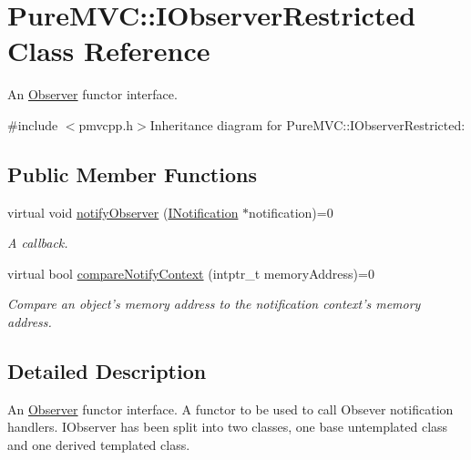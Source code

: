 \hypertarget{class_pure_m_v_c_1_1_i_observer_restricted}{
\section{PureMVC::IObserverRestricted Class Reference}
\label{class_pure_m_v_c_1_1_i_observer_restricted}
}


An \hyperlink{class_pure_m_v_c_1_1_observer}{Observer} functor interface.  


{\ttfamily \#include $<$pmvcpp.h$>$}Inheritance diagram for PureMVC::IObserverRestricted:\subsection*{Public Member Functions}
\begin{DoxyCompactItemize}
\item 
virtual void \hyperlink{class_pure_m_v_c_1_1_i_observer_restricted_a808a9378a31b068f285fe0b4446048e1}{notifyObserver} (\hyperlink{class_pure_m_v_c_1_1_i_notification}{INotification} $\ast$notification)=0
\begin{DoxyCompactList}\small\item\em A callback. \item\end{DoxyCompactList}\item 
virtual bool \hyperlink{class_pure_m_v_c_1_1_i_observer_restricted_a773762b441d4944e77b5b53789a4c52b}{compareNotifyContext} (intptr\_\-t memoryAddress)=0
\begin{DoxyCompactList}\small\item\em Compare an object's memory address to the notification context's memory address. \item\end{DoxyCompactList}\end{DoxyCompactItemize}


\subsection{Detailed Description}
An \hyperlink{class_pure_m_v_c_1_1_observer}{Observer} functor interface. A functor to be used to call Obsever notification handlers. IObserver has been split into two classes, one base untemplated class and one derived templated class. 

